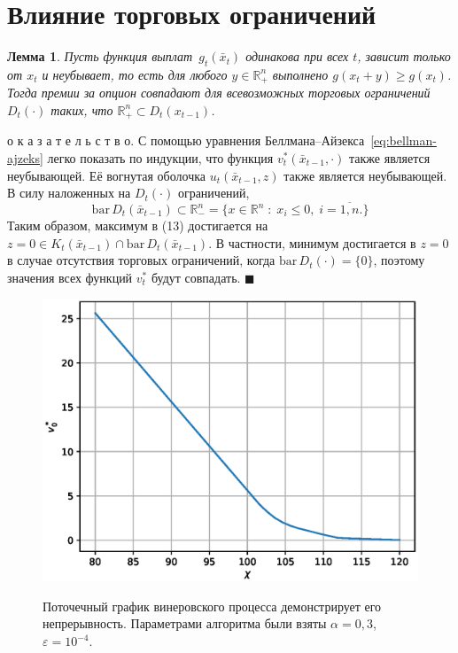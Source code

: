 \documentclass[a4paper, 12pt]{article}
\theoremstyle{def}
\theoremstyle{th}
\newtheorem{lemma}{Лемма}
\theoremstyle{rem}
\renewenvironment{proof}{\parД о к а з а т е л ь с т в о.}{\hfill$\blacksquare$}
\begin{document}
    
    \section{Влияние торговых ограничений}
    \begin{lemma}
        Пусть функция выплат~$g_t(\bar x_t)$ одинакова при всех $t$, зависит только от $x_t$ и неубывает, то есть для любого $y\in\mathbb{R}^n_{+}$ выполнено $g(x_t + y) \geqslant g(x_t)$. Тогда премии за опцион совпадают для всевозможных торговых ограничений $D_t(\cdot)$ таких, что $\mathbb{R}^n_{+} \subset D_t(x_{t-1})$.
    \end{lemma}

    \begin{proof}
        С помощью уравнения Беллмана–Айзекса~\eqref{eq:bellman-ajzeks} легко показать по индукции, что функция $v_t^*(\bar x_{t-1}, \cdot)$ также является неубывающей. Её вогнутая оболочка $u_t(\bar x_{t-1}, z)$ также является неубывающей. В силу наложенных на $D_t(\cdot)$ ограничений,
        \begin{equation}
            \mathrm{bar}\,D_t(\bar x_{t-1}) \subset \mathbb{R}^n_{-} = \{x \in \mathbb{R}^n\;:\;x_i \leqslant 0,\; i=\overline{1,n}.\}
        \end{equation}
        Таким образом, максимум в (13) достигается на $z = 0 \in K_t(\bar x_{t-1}) \cap \mathrm{bar}\,D_t(\bar x_{t-1})$. В частности, минимум достигается в $z = 0$ в случае отсутствия торговых ограничений, когда $\mathrm{bar}\,D_t(\cdot) = \{0\}$, поэтому значения всех функций $v_t^*$ будут совпадать.
    \end{proof}

    \newpage
    \begin{figure}[t]
        \noindent
        \centering
        {
                \includegraphics[width=120mm]{depends_on_strike.eps}
        }
        \caption{Поточечный график винеровского процесса демонстрирует его непрерывность. Параметрами алгоритма были взяты $\alpha = 0,\!3$, $\varepsilon = 10^{-4}$.}
    \end{figure}
\end{document}
